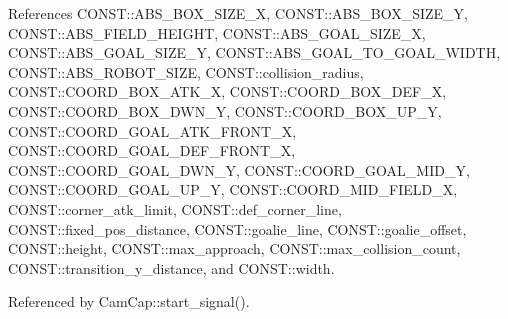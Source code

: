 References C\+O\+N\+S\+T\+::\+A\+B\+S\+\_\+\+B\+O\+X\+\_\+\+S\+I\+Z\+E\+\_\+X, C\+O\+N\+S\+T\+::\+A\+B\+S\+\_\+\+B\+O\+X\+\_\+\+S\+I\+Z\+E\+\_\+Y, C\+O\+N\+S\+T\+::\+A\+B\+S\+\_\+\+F\+I\+E\+L\+D\+\_\+\+H\+E\+I\+G\+HT, C\+O\+N\+S\+T\+::\+A\+B\+S\+\_\+\+G\+O\+A\+L\+\_\+\+S\+I\+Z\+E\+\_\+X, C\+O\+N\+S\+T\+::\+A\+B\+S\+\_\+\+G\+O\+A\+L\+\_\+\+S\+I\+Z\+E\+\_\+Y, C\+O\+N\+S\+T\+::\+A\+B\+S\+\_\+\+G\+O\+A\+L\+\_\+\+T\+O\+\_\+\+G\+O\+A\+L\+\_\+\+W\+I\+D\+TH, C\+O\+N\+S\+T\+::\+A\+B\+S\+\_\+\+R\+O\+B\+O\+T\+\_\+\+S\+I\+ZE, C\+O\+N\+S\+T\+::collision\+\_\+radius, C\+O\+N\+S\+T\+::\+C\+O\+O\+R\+D\+\_\+\+B\+O\+X\+\_\+\+A\+T\+K\+\_\+X, C\+O\+N\+S\+T\+::\+C\+O\+O\+R\+D\+\_\+\+B\+O\+X\+\_\+\+D\+E\+F\+\_\+X, C\+O\+N\+S\+T\+::\+C\+O\+O\+R\+D\+\_\+\+B\+O\+X\+\_\+\+D\+W\+N\+\_\+Y, C\+O\+N\+S\+T\+::\+C\+O\+O\+R\+D\+\_\+\+B\+O\+X\+\_\+\+U\+P\+\_\+Y, C\+O\+N\+S\+T\+::\+C\+O\+O\+R\+D\+\_\+\+G\+O\+A\+L\+\_\+\+A\+T\+K\+\_\+\+F\+R\+O\+N\+T\+\_\+X, C\+O\+N\+S\+T\+::\+C\+O\+O\+R\+D\+\_\+\+G\+O\+A\+L\+\_\+\+D\+E\+F\+\_\+\+F\+R\+O\+N\+T\+\_\+X, C\+O\+N\+S\+T\+::\+C\+O\+O\+R\+D\+\_\+\+G\+O\+A\+L\+\_\+\+D\+W\+N\+\_\+Y, C\+O\+N\+S\+T\+::\+C\+O\+O\+R\+D\+\_\+\+G\+O\+A\+L\+\_\+\+M\+I\+D\+\_\+Y, C\+O\+N\+S\+T\+::\+C\+O\+O\+R\+D\+\_\+\+G\+O\+A\+L\+\_\+\+U\+P\+\_\+Y, C\+O\+N\+S\+T\+::\+C\+O\+O\+R\+D\+\_\+\+M\+I\+D\+\_\+\+F\+I\+E\+L\+D\+\_\+X, C\+O\+N\+S\+T\+::corner\+\_\+atk\+\_\+limit, C\+O\+N\+S\+T\+::def\+\_\+corner\+\_\+line, C\+O\+N\+S\+T\+::fixed\+\_\+pos\+\_\+distance, C\+O\+N\+S\+T\+::goalie\+\_\+line, C\+O\+N\+S\+T\+::goalie\+\_\+offset, C\+O\+N\+S\+T\+::height, C\+O\+N\+S\+T\+::max\+\_\+approach, C\+O\+N\+S\+T\+::max\+\_\+collision\+\_\+count, C\+O\+N\+S\+T\+::transition\+\_\+y\+\_\+distance, and C\+O\+N\+S\+T\+::width.



Referenced by Cam\+Cap\+::start\+\_\+signal().


